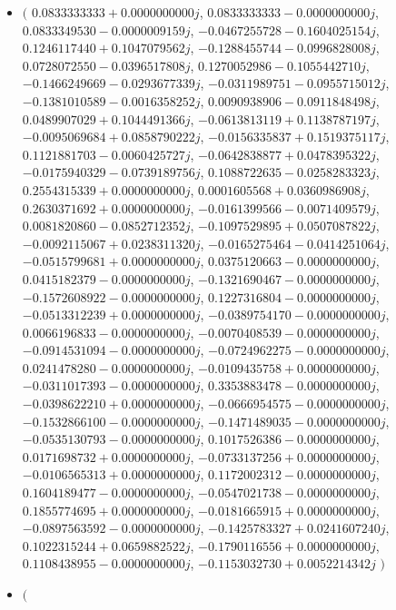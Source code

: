\documentclass[14pt,a4paper]{article}
\begin{document}
\begin{itemize}
\item
$\big($
$0.0833333333+0.0000000000j$, $0.0833333333-0.0000000000j$, $0.0833349530-0.0000009159j$, $-0.0467255728-0.1604025154j$, $0.1246117440+0.1047079562j$, $-0.1288455744-0.0996828008j$, $0.0728072550-0.0396517808j$, $0.1270052986-0.1055442710j$, $-0.1466249669-0.0293677339j$, $-0.0311989751-0.0955715012j$, $-0.1381010589-0.0016358252j$, $0.0090938906-0.0911848498j$, $0.0489907029+0.1044491366j$, $-0.0613813119+0.1138787197j$, $-0.0095069684+0.0858790222j$, $-0.0156335837+0.1519375117j$, $0.1121881703-0.0060425727j$, $-0.0642838877+0.0478395322j$, $-0.0175940329-0.0739189756j$, $0.1088722635-0.0258283323j$, $0.2554315339+0.0000000000j$, $0.0001605568+0.0360986908j$, $0.2630371692+0.0000000000j$, $-0.0161399566-0.0071409579j$, $0.0081820860-0.0852712352j$, $-0.1097529895+0.0507087822j$, $-0.0092115067+0.0238311320j$, $-0.0165275464-0.0414251064j$, $-0.0515799681+0.0000000000j$, $0.0375120663-0.0000000000j$, $0.0415182379-0.0000000000j$, $-0.1321690467-0.0000000000j$, $-0.1572608922-0.0000000000j$, $0.1227316804-0.0000000000j$, $-0.0513312239+0.0000000000j$, $-0.0389754170-0.0000000000j$, $0.0066196833-0.0000000000j$, $-0.0070408539-0.0000000000j$, $-0.0914531094-0.0000000000j$, $-0.0724962275-0.0000000000j$, $0.0241478280-0.0000000000j$, $-0.0109435758+0.0000000000j$, $-0.0311017393-0.0000000000j$, $0.3353883478-0.0000000000j$, $-0.0398622210+0.0000000000j$, $-0.0666954575-0.0000000000j$, $-0.1532866100-0.0000000000j$, $-0.1471489035-0.0000000000j$, $-0.0535130793-0.0000000000j$, $0.1017526386-0.0000000000j$, $0.0171698732+0.0000000000j$, $-0.0733137256+0.0000000000j$, $-0.0106565313+0.0000000000j$, $0.1172002312-0.0000000000j$, $0.1604189477-0.0000000000j$, $-0.0547021738-0.0000000000j$, $0.1855774695+0.0000000000j$, $-0.0181665915+0.0000000000j$, $-0.0897563592-0.0000000000j$, $-0.1425783327+0.0241607240j$, $0.1022315244+0.0659882522j$, $-0.1790116556+0.0000000000j$, $0.1108438955-0.0000000000j$, $-0.1153032730+0.0052214342j$
$\big)$
\item
$\big($

\end{itemize}
\end{document}
